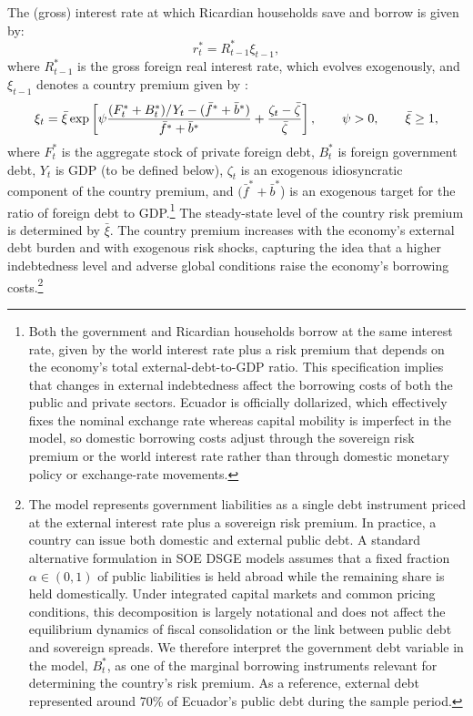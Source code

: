 \documentclass[12pt]{article}
\begin{document}
The (gross) interest rate at which Ricardian households save and borrow is given by:%
\begin{equation}
r_{t}^{\ast } =R_{t-1}^{\ast }\xi _{t-1}, \label{eq:interestrate}
\end{equation}
where $R_{t-1}^{\ast }$ is the gross foreign real interest rate, which evolves exogenously, and $\xi _{t-1}$ denotes a country premium given by \citep[see][]{schmitt2003closing, Adolfson2008evaluating}:
\begin{equation}
\label{eq:country_premium}
\xi _{t}=\bar{\xi}\exp \left[ \psi \frac{(F^{\ast}_t +B_{t}^{\ast})/Y_{t}-(\bar{f}^{\ast} + \bar{b}^{\ast})}{\bar{f}^{\ast} + \bar{b}^{\ast}}+\frac{\zeta _{t}-\bar{\zeta} }{%
\bar{\zeta} }\right] ,\qquad \psi >0,\qquad \bar{\xi}\geq 1,
\end{equation}%
where $F^{\ast}_t$ is the aggregate stock of private foreign debt, $B_t^*$ is foreign government debt, $Y_t$ is GDP (to be defined below), $\zeta _{t}$ is an exogenous idiosyncratic component of the country premium, and $(\bar{f}^{\ast}+\bar{b}^{\ast}$) is an exogenous target for the ratio of foreign debt to GDP.\footnote{Both the government and Ricardian households borrow at the same interest rate, given by the world interest rate plus a risk premium that depends on the economy’s total external-debt-to-GDP ratio. This specification implies that changes in external indebtedness affect the borrowing costs of both the public and private sectors. Ecuador is officially dollarized, which effectively fixes the nominal exchange rate whereas capital mobility is imperfect in the model, so domestic borrowing costs adjust through the sovereign risk premium or the world interest rate rather than through domestic monetary policy or exchange-rate movements.} The steady-state level of the country risk premium is determined by $\bar{\xi}$. The country premium increases with the economy’s external debt burden and with exogenous risk shocks, capturing the idea that a higher indebtedness level and adverse global conditions raise the economy's borrowing costs.\footnote{The model represents government liabilities as a single debt instrument priced at the external interest rate plus a sovereign risk premium. In practice, a country can issue both domestic and external public debt. A standard alternative formulation in SOE DSGE models assumes that a fixed fraction $\alpha \in (0,1)$ of public liabilities is held abroad while the remaining share is held domestically. Under integrated capital markets and common pricing conditions, this decomposition is largely notational and does not affect the equilibrium dynamics of fiscal consolidation or the link between public debt and sovereign spreads. We therefore interpret the government debt variable in the model, $B_t^*$, as one of the marginal borrowing instruments relevant for determining the country's risk premium. As a reference, external debt represented around 70\% of Ecuador’s public debt during the sample period.}
\end{document}
